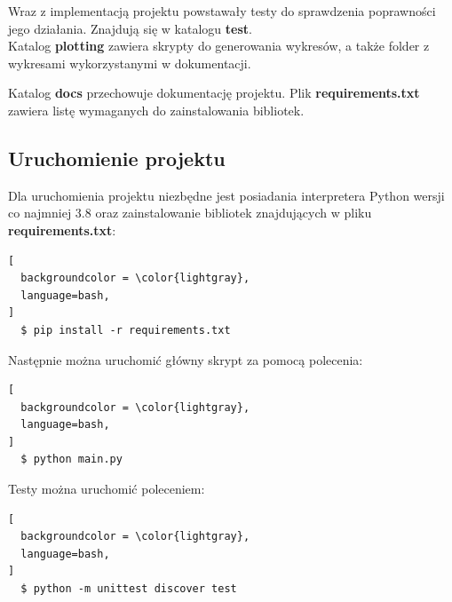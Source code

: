 \documentclass[12pt,a4paper]{article}
\begin{document}
Wraz z implementacją projektu powstawały testy do sprawdzenia poprawności
jego działania. Znajdują się w katalogu \textbf{test}. \\

Katalog \textbf{plotting} zawiera skrypty do generowania wykresów,
a także folder z wykresami wykorzystanymi w dokumentacji.

Katalog \textbf{docs} przechowuje dokumentację projektu.
Plik \textbf{requirements.txt} zawiera listę wymaganych do zainstalowania
bibliotek.

\subsection{Uruchomienie projektu}

Dla uruchomienia projektu niezbędne jest posiadania interpretera Python wersji co najmniej 3.8
oraz zainstalowanie bibliotek znajdujących w pliku \textbf{requirements.txt}:

\begin{lstlisting}[
  backgroundcolor = \color{lightgray},
  language=bash,
]
  $ pip install -r requirements.txt
\end{lstlisting}

\bigskip

Następnie można uruchomić główny skrypt za pomocą polecenia:

\begin{lstlisting}[
  backgroundcolor = \color{lightgray},
  language=bash,
]
  $ python main.py
\end{lstlisting}

Testy można uruchomić poleceniem:

\begin{lstlisting}[
  backgroundcolor = \color{lightgray},
  language=bash,
]
  $ python -m unittest discover test
\end{lstlisting}

\end{document}
